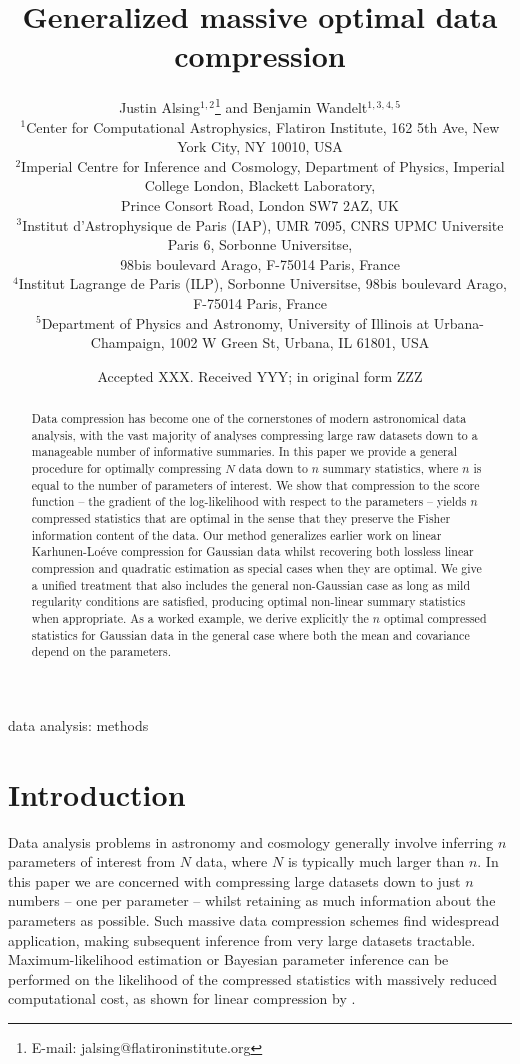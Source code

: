 \documentclass[fleqn,usenatbib]{mnras}
\title[Generalized massive data compression]{Generalized massive optimal data compression}
\author[J. Alsing, B. Wandelt]{
Justin Alsing$^{1, 2}$\thanks{E-mail: jalsing@flatironinstitute.org}
and Benjamin Wandelt$^{1,3,4,5}$
\\
$^{1}$Center for Computational Astrophysics, Flatiron Institute, 162 5th Ave, New York City, NY 10010, USA\\
$^{2}$Imperial Centre for Inference and Cosmology, Department of Physics, Imperial College London, Blackett Laboratory,\\  Prince Consort
Road, London SW7 2AZ, UK\\ 
$^{3}$Institut d'Astrophysique de Paris (IAP), UMR 7095, CNRS UPMC Universite Paris 6, Sorbonne Universitse,\\  98bis boulevard Arago, F-75014 Paris, France\\
$^{4}$Institut Lagrange de Paris (ILP), Sorbonne Universitse, 98bis boulevard Arago, F-75014 Paris, France\\
$^{5}$Department of Physics and Astronomy, University of Illinois at Urbana-Champaign, 1002 W Green St, Urbana, IL 61801, USA
}
\date{Accepted XXX. Received YYY; in original form ZZZ}
\begin{document}
\label{firstpage}
\pagerange{\pageref{firstpage}--\pageref{lastpage}}
\maketitle

\begin{abstract}
Data compression has become one of the cornerstones of modern astronomical data analysis, with the vast majority of analyses compressing large raw datasets down to a manageable number of informative summaries. In this paper we provide a general procedure for optimally compressing $N$ data down to $n$ summary statistics, where $n$ is equal to the number of parameters of interest. We show that compression to the score function -- the gradient of the log-likelihood with respect to the parameters -- yields $n$ compressed statistics that are optimal in the sense that they preserve the Fisher information content of the data. Our method generalizes earlier work on linear Karhunen-Lo\'{e}ve compression for Gaussian data whilst recovering both lossless linear compression and quadratic estimation as special cases when they are optimal. We give a unified treatment that also includes the general non-Gaussian case as long as mild regularity conditions are satisfied, producing optimal non-linear summary statistics when appropriate.  As a worked example, we derive explicitly the $n$ optimal compressed statistics for Gaussian data in the general case where both the mean and covariance depend on the parameters.
\end{abstract}

\begin{keywords}
data analysis: methods
\end{keywords}



\section{Introduction}
%
Data analysis problems in astronomy and cosmology generally involve inferring $n$ parameters of interest from $N$ data, where $N$ is typically much larger than $n$. In this paper we are concerned with compressing large datasets down to just $n$ numbers -- one per parameter -- whilst retaining as much information about the parameters as possible. Such massive data compression schemes find widespread application, making subsequent inference from very large datasets tractable. Maximum-likelihood estimation or Bayesian parameter inference can be performed on the likelihood of the compressed statistics with massively reduced computational cost, as shown for linear compression by \cite{Heavens2000a}.
\end{document}
